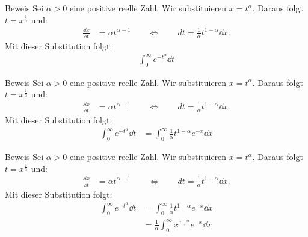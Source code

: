 \documentclass[10pt]{beamer}
\begin{document}
\begin{frame}{Beweis}
    Sei \( \alpha > 0 \) eine positive reelle Zahl. Wir substituieren \( x = t^{\alpha} \). Daraus folgt \( t = x^{\frac{1}{\alpha}} \) und:
    \begin{align*}
        \frac{\dd{x}}{\dd{t}}
        & = \alpha t^{\alpha - 1}
        \quad\quad \Leftrightarrow \quad\quad dt = \frac{1}{\alpha} t^{1 - \alpha} \dd{x}.
    \end{align*}
    Mit dieser Substitution folgt:
    \begin{align*}
        \int_{0}^{\infty} e^{-t^{\alpha}} \dd{t}
    \end{align*}
\end{frame}



\begin{frame}{Beweis}
    Sei \( \alpha > 0 \) eine positive reelle Zahl. Wir substituieren \( x = t^{\alpha} \). Daraus folgt \( t = x^{\frac{1}{\alpha}} \) und:
    \begin{align*}
        \frac{\dd{x}}{\dd{t}}
        & = \alpha t^{\alpha - 1}
        \quad\quad \Leftrightarrow \quad\quad dt = \frac{1}{\alpha} t^{1 - \alpha} \dd{x}.
    \end{align*}
    Mit dieser Substitution folgt:
    \begin{align*}
        \int_{0}^{\infty} e^{-t^{\alpha}} \dd{t}
        & = \int_{0}^{\infty} \frac{1}{\alpha} t^{1 - \alpha} e^{-x} \dd{x}
    \end{align*}
\end{frame}



\begin{frame}{Beweis}
    Sei \( \alpha > 0 \) eine positive reelle Zahl. Wir substituieren \( x = t^{\alpha} \). Daraus folgt \( t = x^{\frac{1}{\alpha}} \) und:
    \begin{align*}
        \frac{\dd{x}}{\dd{t}}
        & = \alpha t^{\alpha - 1}
        \quad\quad \Leftrightarrow \quad\quad dt = \frac{1}{\alpha} t^{1 - \alpha} \dd{x}.
    \end{align*}
    Mit dieser Substitution folgt:
    \begin{align*}
        \int_{0}^{\infty} e^{-t^{\alpha}} \dd{t}
        & = \int_{0}^{\infty} \frac{1}{\alpha} t^{1 - \alpha} e^{-x} \dd{x} \\
        & = \frac{1}{\alpha} \int_{0}^{\infty} x^{\frac{1 - \alpha}{\alpha}} e^{-x} \dd{x}
    \end{align*}
\end{frame}
\end{document}
